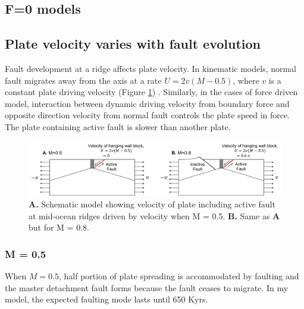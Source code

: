 \documentclass[letterpaper,12pt,notitle]{memphisthesis}                     %
\begin{document}
\subsection{F=0 models}

\subsection{Plate velocity varies with fault evolution}

Fault development at a ridge affects plate velocity. In kinematic models, normal fault migrates away from the axis at a rate $U = 2v(M-0.5)$, where $v$ is a constant plate driving velocity (Figure \ref{fig:hangingwall}) \citep{Buck2005}. Similarly, in the cases of force driven model, interaction between dynamic driving velocity from boundary force and opposite direction velocity from normal fault controls the plate speed in force. The plate containing active fault is slower than another plate.


\begin{figure}[!htb]
	\centering
	\includegraphics[width=0.99\linewidth]{./figs/hangingwall.pdf}
	\caption{\textbf{A.} Schematic model showing velocity of plate including active fault at mid-ocean ridges driven by velocity when M = 0.5. \textbf{B.} Same as \textbf{A} but for M = 0.8. }
	\label{fig:hangingwall}
\end{figure}

\subsubsection{M = 0.5}

When $M=0.5$, half portion of plate spreading is accommodated by faulting and the master detachment fault forms because the fault ceases to migrate.
In my model, the expected faulting mode lasts until 650 Kyrs.

\end{document}
